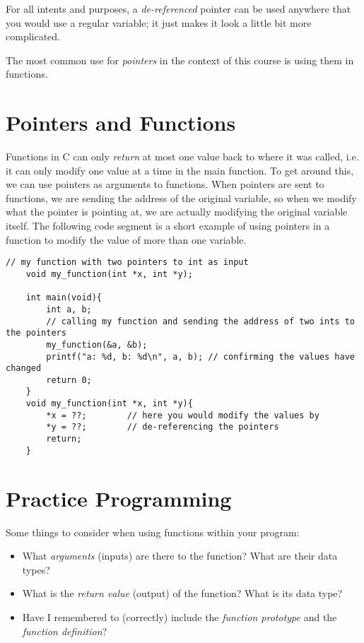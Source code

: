 \documentclass{pass}
\begin{document}
For all intents and purposes, a \textit{de-referenced} pointer can be used anywhere that you would use a regular variable; it just makes it look a little bit more complicated.

The most common use for \textit{pointers} in the context of this course is using them in functions.


\section*{Pointers and Functions}
Functions in C can only \textit{return} at most one value back to where it was called, i.e. it can only modify one value at a time in the main function. To get around this, we can use pointers as arguments to functions. When pointers are sent to functions, we are sending the address of the original variable, so when we modify what the pointer is pointing at, we are actually modifying the original variable itself. The following code segment is a short example of using pointers in a function to modify the value of more than one variable.

\begin{lstlisting}[style=CStyle]
	// my function with two pointers to int as input
	void my_function(int *x, int *y);
	
	int main(void){
		int a, b;
		// calling my function and sending the address of two ints to the pointers
		my_function(&a, &b);
		printf("a: %d, b: %d\n", a, b); // confirming the values have changed
		return 0;
	}
	void my_function(int *x, int *y){
		*x = ??;		// here you would modify the values by
		*y = ??;		// de-referencing the pointers
		return;
	}
\end{lstlisting}

\pagebreak

\section*{Practice Programming}
Some things to consider when using functions within your program:
\begin{itemize}
\item What \textit{arguments} (inputs) are there to the function? What are their data types?
\item What is the \textit{return value} (output) of the function? What is its data type?
\item Have I remembered to (correctly) include the \textit{function prototype} and the \textit{function definition}?\\
\end{itemize}
\end{document}
